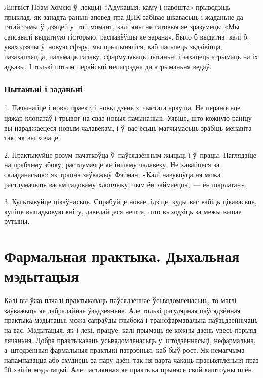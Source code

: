 Лінгвіст Ноам Хомскі ў~лекцыі «Адукацыя: каму і навошта» прыводзіць прыклад, як занадта раньні аповед пра ДНК забівае цікавасьць і жаданьне да гэтай тэмы ў~дзяцей у~той момант, калі яны не гатовыя яе зразумець: «Мы сапсавалі выдатную гісторыю, распавёўшы яе зарана». Было б выдатна, калі б, уваходзячы ў~новую сфэру, мы прыпыняліся, каб пасьпець зьдзівіцца, пазахапляцца, паламаць галаву, сфармуляваць пытаньні і захацець атрымаць на іх адказы. І толькі потым перайсьці непасрэдна да атрыманьня ведаў.

\subsubsection{Пытаньні і заданьні}

1. Пачынайце і новы праект, і новы дзень з~чыстага аркуша. Не пераносьце цяжар клопатаў і трывог на свае новыя пачынаньні. Уявіце, што кожную раніцу вы нараджаецеся новым чалавекам, і ў~вас ёсьць магчымасьць зрабіць менавіта так, як вы хочаце.

2. Практыкуйце розум пачаткоўца ў~паўсядзённым жыцьці і ў~працы. Паглядзіце на праблему збоку, растлумачце яе іншаму чалавеку. Не хавайцеся за складанасьцю: як трапна заўважыў Фэйман: «Калі навукоўца ня можа растлумачыць васьмігадоваму хлопчыку, чым ён займаецца,~--- ён шарлатан».

3. Культывуйце цікаўнасьць. Спрабуйце новае, ідзіце, куды вас вабіць цікавасьць, купіце выпадковую кнігу, даведайцеся нешта, што выходзіць за межы вашае рутыны.


\section{Фармальная практыка. Дыхальная мэдытацыя}

Калі вы ўжо пачалі практыкаваць паўсядзённае ўсьвядомленасьць, то маглі заўважыць яе дабрадайнае ўзьдзеяньне. Але толькі рэгулярная паўсядзённая практыка мэдытацыі можа сапраўды глыбока і трансфармавальна паўзьдзейнічаць на вас. Мэдытацыя, як і лекі, працуе, калі прымаць яе кожны дзень увесь пэрыяд лячэньня. Добра практыкаваць усьвядомленасьць у~штодзённасьці, нефармальна, а~штодзённыя фармальныя практыкі патрэбныя, каб быў рост. Як немагчыма напампавацца або схуднець за пару дзён, так ня варта чакаць прасьвятленьня праз 20 хвілін мэдытацыі. Але пастаянная яе практыка прынясе свой каштоўны плён.

